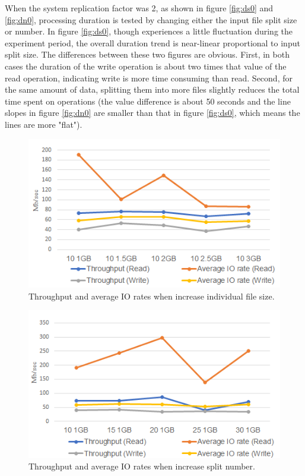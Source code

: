 \documentclass[11pt,twocolumn]{article}
\begin{document}
When the system replication factor was 2, as shown in figure \ref{fig:ds0} and \ref{fig:dn0}, processing duration is tested by changing either the input file split size or number. In figure \ref{fig:ds0}, though experiences a little fluctuation during the experiment period, the overall duration trend is near-linear proportional to input split size. The differences between these two figures are obvious. First, in both cases the duration of the write operation is about two times that value of the read operation, indicating write is more time consuming than read. Second, for the same amount of data, splitting them into more files slightly reduces the total time spent on operations (the value difference is about 50 seconds and the line slopes in figure \ref{fig:dn0} are smaller than that in figure \ref{fig:ds0}, which means the lines are more "flat").
\begin{figure}[htp]
    \centering
        \includegraphics[width=\linewidth]{ts0}
        \caption{Throughput and average IO rates when increase individual file size.}
        \label{fig:ts0}
\end{figure}
\begin{figure}[htp]
    \centering
        \includegraphics[width=\linewidth]{tn0}
        \caption{Throughput and average IO rates when increase split number.}
        \label{fig:tn0}
\end{figure}
\end{document}
